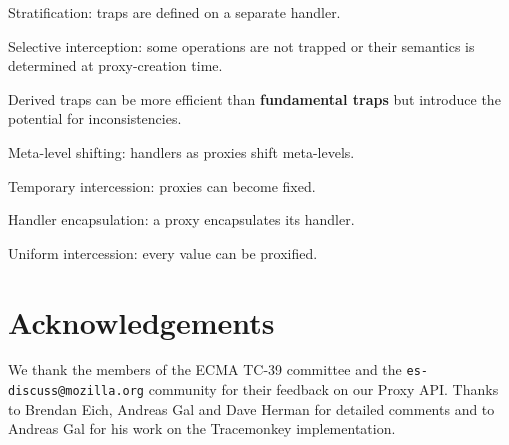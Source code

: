 \documentclass{sig-alternate}
\begin{document}
\begin{description*}
  \item[Stratification:] traps are defined on a separate handler.
  \item[Selective interception:] some operations are not trapped or their semantics is determined at proxy-creation time.
  \item[Derived traps] can be more efficient than \textbf{fundamental traps} but introduce the potential for inconsistencies.
  \item[Meta-level shifting:] handlers as proxies shift meta-levels.
  \item[Temporary intercession:] proxies can become fixed.
  \item[Handler encapsulation:] a proxy encapsulates its handler.
  \item[Uniform intercession:] every value can be proxified.
\end{description*}

\section*{Acknowledgements}

We thank the members of the ECMA TC-39 committee and the \texttt{es-discuss@mozilla.org} community for their feedback on our Proxy API. Thanks to Brendan Eich, Andreas Gal and Dave Herman for detailed comments and to Andreas Gal for his work on the Tracemonkey implementation.



\end{document}
